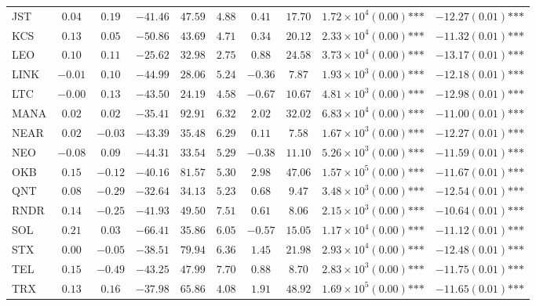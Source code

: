 \documentclass{article}
\begin{document}
\begin{table}[htbp]
\begin{adjustbox}{width=\textwidth}
\begin{tabular}{lccccccccc}
JST & $0.04$ & $0.19$ & $-41.46$ & $47.59$ & $4.88$ & $0.41$ & $17.70$ & $1.72\times 10^{4}(0.00)\text{***}$ & $-12.27(0.01)\text{***}$ \\
KCS & $0.13$ & $0.05$ & $-50.86$ & $43.69$ & $4.71$ & $0.34$ & $20.12$ & $2.33\times 10^{4}(0.00)\text{***}$ & $-11.32(0.01)\text{***}$ \\
LEO & $0.10$ & $0.11$ & $-25.62$ & $32.98$ & $2.75$ & $0.88$ & $24.58$ & $3.73\times 10^{4}(0.00)\text{***}$ & $-13.17(0.01)\text{***}$ \\
LINK & $-0.01$ & $0.10$ & $-44.99$ & $28.06$ & $5.24$ & $-0.36$ & $7.87$ & $1.93\times 10^{3}(0.00)\text{***}$ & $-12.18(0.01)\text{***}$ \\
LTC & $-0.00$ & $0.13$ & $-43.50$ & $24.19$ & $4.58$ & $-0.67$ & $10.67$ & $4.81\times 10^{3}(0.00)\text{***}$ & $-12.98(0.01)\text{***}$ \\
MANA & $0.02$ & $0.02$ & $-35.41$ & $92.91$ & $6.32$ & $2.02$ & $32.02$ & $6.83\times 10^{4}(0.00)\text{***}$ & $-11.00(0.01)\text{***}$ \\
NEAR & $0.02$ & $-0.03$ & $-43.39$ & $35.48$ & $6.29$ & $0.11$ & $7.58$ & $1.67\times 10^{3}(0.00)\text{***}$ & $-12.27(0.01)\text{***}$ \\
NEO & $-0.08$ & $0.09$ & $-44.31$ & $33.54$ & $5.29$ & $-0.38$ & $11.10$ & $5.26\times 10^{3}(0.00)\text{***}$ & $-11.59(0.01)\text{***}$ \\
OKB & $0.15$ & $-0.12$ & $-40.16$ & $81.57$ & $5.30$ & $2.98$ & $47.06$ & $1.57\times 10^{5}(0.00)\text{***}$ & $-11.67(0.01)\text{***}$ \\
QNT & $0.08$ & $-0.29$ & $-32.64$ & $34.13$ & $5.23$ & $0.68$ & $9.47$ & $3.48\times 10^{3}(0.00)\text{***}$ & $-12.54(0.01)\text{***}$ \\
RNDR & $0.14$ & $-0.25$ & $-41.93$ & $49.50$ & $7.51$ & $0.61$ & $8.06$ & $2.15\times 10^{3}(0.00)\text{***}$ & $-10.64(0.01)\text{***}$ \\
SOL & $0.21$ & $0.03$ & $-66.41$ & $35.86$ & $6.05$ & $-0.57$ & $15.05$ & $1.17\times 10^{4}(0.00)\text{***}$ & $-11.12(0.01)\text{***}$ \\
STX & $0.00$ & $-0.05$ & $-38.51$ & $79.94$ & $6.36$ & $1.45$ & $21.98$ & $2.93\times 10^{4}(0.00)\text{***}$ & $-12.48(0.01)\text{***}$ \\
TEL & $0.15$ & $-0.49$ & $-43.25$ & $47.99$ & $7.70$ & $0.88$ & $8.70$ & $2.83\times 10^{3}(0.00)\text{***}$ & $-11.75(0.01)\text{***}$ \\
TRX & $0.13$ & $0.16$ & $-37.98$ & $65.86$ & $4.08$ & $1.91$ & $48.92$ & $1.69\times 10^{5}(0.00)\text{***}$ & $-11.65(0.01)\text{***}$ \\

\end{tabular}
\end{adjustbox}
\end{table}
\end{document}
